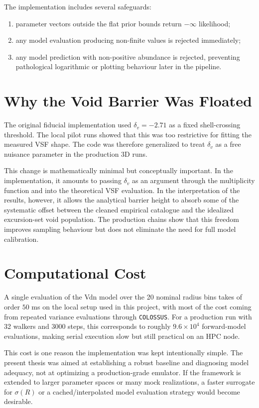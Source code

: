 \documentclass[12pt]{report}
\begin{document}
The implementation includes several safeguards:
\begin{enumerate}
    \item parameter vectors outside the flat prior bounds return $-\infty$ likelihood;
    \item any model evaluation producing non-finite values is rejected immediately;
    \item any model prediction with non-positive abundance is rejected, preventing pathological logarithmic or plotting behaviour later in the pipeline.
\end{enumerate}

\section{Why the Void Barrier Was Floated}

The original fiducial implementation used $\delta_v=-2.71$ as a fixed shell-crossing threshold. The local pilot runs showed that this was too restrictive for fitting the measured VSF shape. The code was therefore generalized to treat $\delta_v$ as a free nuisance parameter in the production 3D runs.

This change is mathematically minimal but conceptually important. In the implementation, it amounts to passing $\delta_v$ as an argument through the multiplicity function and into the theoretical VSF evaluation. In the interpretation of the results, however, it allows the analytical barrier height to absorb some of the systematic offset between the cleaned empirical catalogue and the idealized excursion-set void population. The production chains show that this freedom improves sampling behaviour but does not eliminate the need for full model calibration.

\section{Computational Cost}

A single evaluation of the Vdn model over the 20 nominal radius bins takes of order $50$ ms on the local setup used in this project, with most of the cost coming from repeated variance evaluations through \texttt{COLOSSUS}. For a production run with 32 walkers and 3000 steps, this corresponds to roughly $9.6\times10^4$ forward-model evaluations, making serial execution slow but still practical on an HPC node.

This cost is one reason the implementation was kept intentionally simple. The present thesis was aimed at establishing a robust baseline and diagnosing model adequacy, not at optimizing a production-grade emulator. If the framework is extended to larger parameter spaces or many mock realizations, a faster surrogate for $\sigma(R)$ or a cached/interpolated model evaluation strategy would become desirable.
\end{document}
